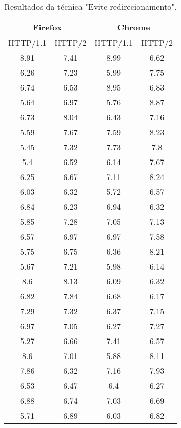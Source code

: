 \begin{table}[H]
	\centering
	\caption{Resultados da técnica "Evite redirecionamento".}
	\label{resultados-redirecionamento-apend}
	\begin{tabular}{cccc}
		\hline
		\multicolumn{2}{c}{\textbf{Firefox}} & \multicolumn{2}{c}{\textbf{Chrome}} \\
		\hline
		HTTP/1.1 & HTTP/2 & HTTP/1.1 & HTTP/2 \\
		\hline
		8.91 & 7.41 & 8.99 & 6.62 \\
		6.26 & 7.23 & 5.99 & 7.75 \\
		6.74 & 6.53 & 8.95 & 6.83 \\
		5.64 & 6.97 & 5.76 & 8.87 \\
		6.73 & 8.04 & 6.43 & 7.16 \\
		5.59 & 7.67 & 7.59 & 8.23 \\
		5.45 & 7.32 & 7.73 & 7.8 \\
		5.4 & 6.52 & 6.14 & 7.67 \\
		6.25 & 6.67 & 7.11 & 8.24 \\
		6.03 & 6.32 & 5.72 & 6.57 \\
		6.84 & 6.23 & 6.94 & 6.32 \\
		5.85 & 7.28 & 7.05 & 7.13 \\
		6.57 & 6.97 & 6.97 & 7.58 \\
		5.75 & 6.75 & 6.36 & 8.21 \\
		5.67 & 7.21 & 5.98 & 6.14 \\ 
		8.6 & 8.13 & 6.09 & 6.32 \\
		6.82 & 7.84 & 6.68 & 6.17 \\
		7.29 & 7.32 & 6.37 & 7.15 \\
		6.97 & 7.05 & 6.27 & 7.27 \\
		5.27 & 6.66 & 7.41 & 6.57 \\
		8.6 & 7.01 & 5.88 & 8.11 \\
		7.86 & 6.32 & 7.16 & 7.93 \\
		6.53 & 6.47 & 6.4 & 6.27 \\
		6.88 & 6.74 & 7.03 & 6.69 \\
		5.71 & 6.89 & 6.03 & 6.82 \\
		\hline
	\end{tabular}
\end{table}